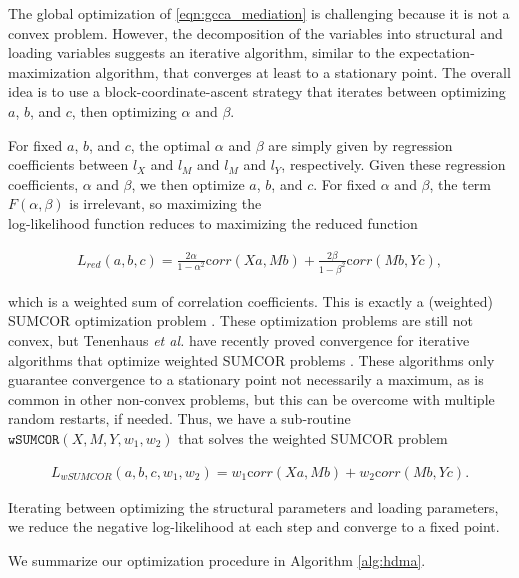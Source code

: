 \documentclass[
]{article}
\begin{document}
The global optimization of \ref{eqn:gcca_mediation} is challenging
because it is not a convex problem. However, the decomposition of the
variables into structural and loading variables suggests an iterative
algorithm, similar to the expectation-maximization algorithm, that
converges at least to a stationary point. The overall idea is to use a
block-coordinate-ascent strategy that iterates between optimizing \(a\),
\(b\), and \(c\), then optimizing \(\alpha\) and \(\beta\).

For fixed \(a\), \(b\), and \(c\), the optimal \(\alpha\) and \(\beta\)
are simply given by regression coefficients between \(l_X\) and \(l_M\)
and \(l_M\) and \(l_Y\), respectively. Given these regression
coefficients, \(\alpha\) and \(\beta\), we then optimize \(a\), \(b\),
and \(c\). For fixed \(\alpha\) and \(\beta\), the term
\(F(\alpha, \beta)\) is irrelevant, so maximizing the\\
log-likelihood function reduces to maximizing the reduced function

\begin{align}
L_{red}(a,b,c) = \frac{2\alpha}{1-\alpha^2} {\mathrm corr}\left(Xa, Mb\right) + \frac{2\beta}{1-\beta^2} {\mathrm corr}\left(Mb, Yc\right),
\end{align}

which is a weighted sum of correlation coefficients. This is exactly a
(weighted) SUMCOR optimization problem \cite{tenenhaus2011regularized}.
These optimization problems are still not convex, but Tenenhaus
\textit{et al.} have recently proved convergence for iterative
algorithms that optimize weighted SUMCOR problems
\cite{tenenhaus2011regularized,
tenenhaus2017regularized, tenenhaus2015kernel}. These algorithms only
guarantee convergence to a stationary point not necessarily a maximum,
as is common in other non-convex problems, but this can be overcome with
multiple random restarts, if needed. Thus, we have a sub-routine
\(\texttt{wSUMCOR}(X, M, Y, w_1, w_2)\) that solves the weighted SUMCOR
problem

\begin{align}
L_{wSUMCOR}(a,b,c, w_1, w_2) = w_1 {\mathrm corr}\left(Xa, Mb\right) + w_2 {\mathrm corr}\left(Mb, Yc\right).
\end{align}

Iterating between optimizing the structural parameters and loading
parameters, we reduce the negative log-likelihood at each step and
converge to a fixed point.

We summarize our optimization procedure in Algorithm \ref{alg:hdma}.
\end{document}
